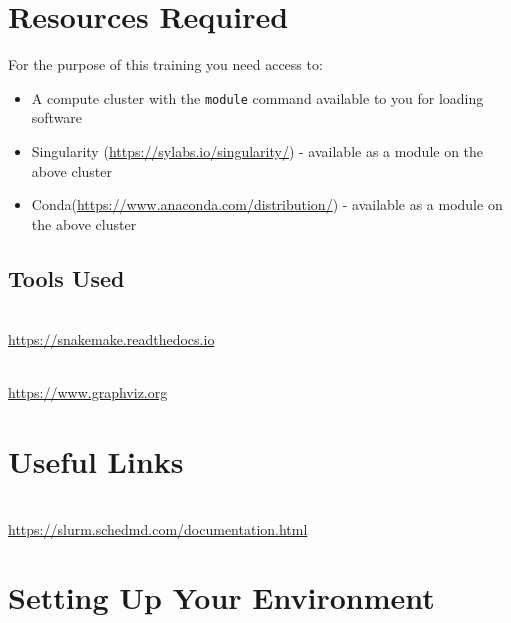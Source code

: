 \section{Resources Required}

For the purpose of this training you need access to:

\begin{itemize}
  \item A compute cluster with the \texttt{module} command available to you for loading software
  \item Singularity (\url{https://sylabs.io/singularity/}) - available as a module on the above cluster
  \item Conda(\url{https://www.anaconda.com/distribution/}) - available as a module on the above cluster
\end{itemize}


\subsection{Tools Used}
\begin{description}[style=multiline,labelindent=0cm,align=left,leftmargin=0.5cm]
  \item[Snakemake]\hfill\\
    \url{https://snakemake.readthedocs.io}
  \item[Graphviz]\hfill\\
    \url{https://www.graphviz.org}
\end{description}

\section{Useful Links}
 
\begin{description}[style=multiline,labelindent=0cm,align=left,leftmargin=0.5cm]
  \item[Slurm Documentation]\hfill\\
    \url{https://slurm.schedmd.com/documentation.html}
\end{description}

\newpage

\section{Setting Up Your Environment}

